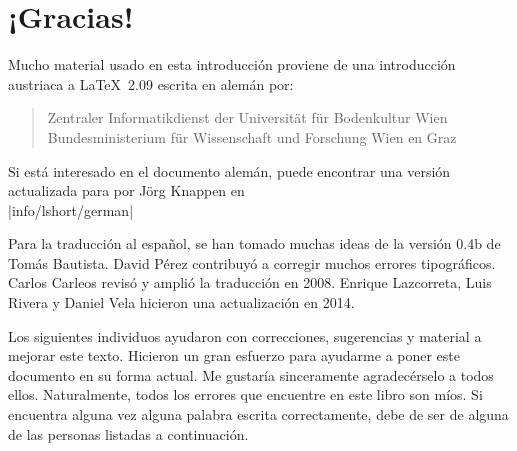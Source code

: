 \chapter{¡Gracias!}
Mucho material usado en esta introducción proviene de una introducción austriaca a \LaTeX\ 2.09 escrita en alemán por:
\begin{verse}
%
{Zentraler Informatikdienst der Universit\"at f\"ur Bodenkultur Wien}
%
   {Bundesministerium f\"ur Wissenschaft und Forschung Wien}
%
   {en Graz}
\end{verse}

Si está interesado en el documento alemán, puede encontrar una versión actualizada para \LaTeXe{} por J\"org Knappen en\\ \CTAN|info/lshort/german|

Para la traducción al español, se han tomado muchas ideas de la versión 0.4b de Tomás Bautista.  David Pérez contribuyó a corregir muchos errores tipográficos. Carlos Carleos revisó y amplió la traducción en 2008. Enrique Lazcorreta, Luis Rivera y Daniel Vela hicieron una actualización en 2014. 

\newpage Los siguientes individuos ayudaron con correcciones, sugerencias y material a mejorar este texto.  Hicieron un gran esfuerzo para ayudarme a poner este documento en su forma actual.  Me gustaría sinceramente agradecérselo a todos ellos.  Naturalmente, todos los errores que encuentre en este libro son míos.  Si encuentra alguna vez alguna palabra escrita correctamente, debe de ser de alguna de las personas listadas a continuación.

